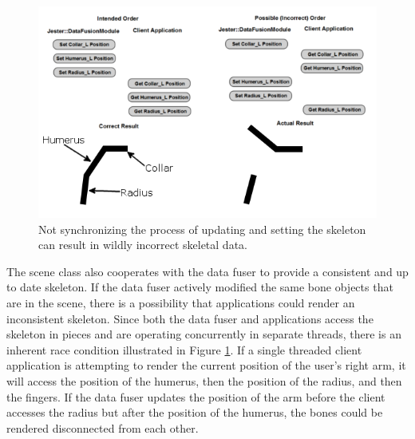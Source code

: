\begin{figure}[h]
\centering
\includegraphics[width=1\textwidth]{figures/dataRace}
\caption{Not synchronizing the process of updating and setting the skeleton can result in wildly incorrect skeletal data.}
\label{fig:data_race}
\end{figure}

The scene class also cooperates with the data fuser to provide a consistent and up to date skeleton. If the data fuser actively modified the same bone objects that are in the scene, there is a possibility that applications could render an inconsistent skeleton. Since both the data fuser and applications access the skeleton in pieces and are operating concurrently in separate threads, there is an inherent race condition illustrated in Figure \ref{fig:data_race}. If a single threaded client application is attempting to render the current position of the user's right arm, it will access the position of the humerus, then the position of the radius, and then the fingers. If the data fuser updates the position of the arm before the client accesses the radius but after the position of the humerus, the bones could be rendered disconnected from each other.

